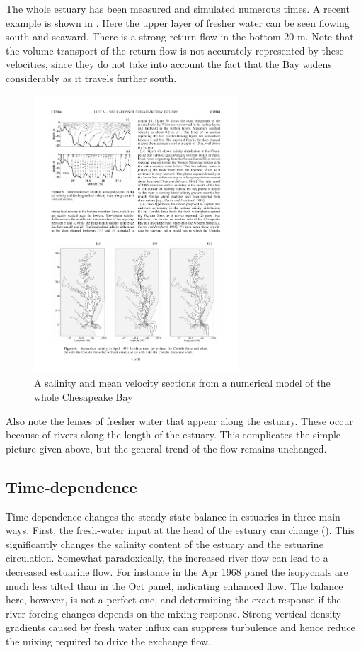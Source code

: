 The whole estuary has been measured and simulated numerous times.  A recent example is shown in .  Here the upper layer of fresher water can be seen flowing south and seaward.  There is a strong return flow in the bottom 20 m.  Note that the volume transport of the return flow is not accurately represented by these velocities, since they do not take into account the fact that the Bay widens considerably as it travels further south.
\begin{figure}[htb]
  \centering
  \includegraphics[width=3in]{figs/LiEtAl05Fig5}
  \caption{A salinity and mean velocity sections from a numerical
    model of the whole Chesapeake Bay \citep{lietal05}}
  \label{fig:LiEtAl05Fig5}
\end{figure}

Also note the lenses of fresher water that appear along the estuary. These occur because of rivers along the length of the estuary. This complicates the simple picture given above, but the general trend of the flow remains unchanged.



\subsection{Time-dependence}

Time dependence changes the steady-state balance in estuaries in three main ways.  First, the fresh-water input at the head of the estuary can change ().  This significantly changes the salinity content of the estuary and the estuarine circulation.  Somewhat paradoxically, the increased river flow can lead to a decreased estuarine flow.  For instance in the Apr 1968 panel the isopycnals are much less tilted than in the Oct panel, indicating enhanced flow.  The balance here, however, is not a perfect one, and determining the exact response if the river forcing changes depends on the mixing response.  Strong vertical density gradients caused by fresh water influx can suppress turbulence and hence reduce the mixing required to drive the exchange flow.

